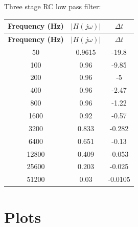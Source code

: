 \documentclass[a4paper,12pt]{article}
\begin{document}
Three stage RC low pass filter:\\
\begin{longtable}{|c|c|c|}
\hline
\textbf{Frequency (Hz)} & \textbf{$|H(j\omega)|$} & \textbf{$\Delta t$} \\
\hline
\endfirsthead
\hline
\textbf{Frequency (Hz)} & \textbf{$|H(j\omega)|$} & \textbf{$\Delta t$} \\
\hline
\endhead
\hline
\endfoot
\hline
\endlastfoot
50 & 0.9615 & -19.8 \\
100 & 0.96 & -9.85 \\
200 & 0.96 & -5 \\
400 & 0.96 & -2.47 \\
800 & 0.96 & -1.22 \\
1600 & 0.92 & -0.57 \\
3200 & 0.833 & -0.282 \\
6400 & 0.651 & -0.13 \\
12800 & 0.409 & -0.053 \\
25600 & 0.203 & -0.025 \\
51200 & 0.03 & -0.0105 \\
\end{longtable}
\pagebreak
\section{Plots}
\end{document}
